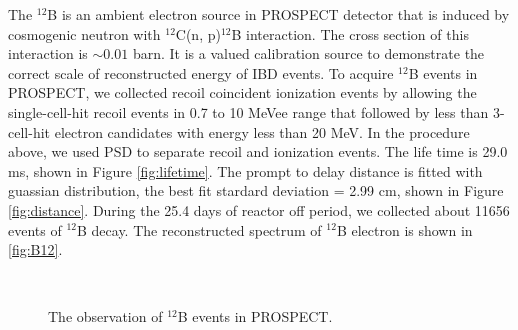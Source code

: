 The $^{12}$B is an ambient electron source in PROSPECT detector that is induced by cosmogenic neutron with $^{12}$C(n, p)$^{12}$B interaction.
The cross section of this interaction is $\sim 0.01$ barn. 
It is a valued calibration source to demonstrate the correct scale of reconstructed energy of IBD events.
To acquire $^{12}$B events in PROSPECT, we collected recoil coincident ionization events by allowing the single-cell-hit recoil events in 0.7 to 10 MeVee range that followed by less than 3-cell-hit electron candidates with energy less than 20 MeV. 
In the procedure above, we used PSD to separate recoil and ionization events. The life time is 29.0 ms, shown in Figure \ref{fig:lifetime}. 
The prompt to delay distance is fitted with guassian distribution, the best fit  stardard deviation = 2.99 cm, shown in Figure \ref{fig:distance}. 
During the 25.4 days of reactor off period, we collected about 11656 events of $^{12}$B decay. 
The reconstructed spectrum of $^{12}$B electron is shown in \ref{fig:B12}.
\begin{figure}[h!]
\centering
{}\quad
{} \\
\caption{The observation of $^{12}$B events in PROSPECT.}
\label{fig:B12plots}
\end{figure}


